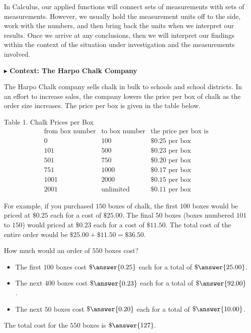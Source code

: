 \documentclass{ximera}
\begin{document}
In Calculus, our applied functions will connect sets of measurements with sets of measurements. However, we usually hold the measurement units off to the side, work with the numbers, and then bring back the units when we interpret our results.  Once we arrive at any conclusions, then we will interpret our findings within the context of the situation under investigation and the measurements involved. 




$\blacktriangleright$ \textbf{Context: The Harpo Chalk Company} 

The Harpo Chalk company sells chalk in bulk to schools and school districts. In an effort to increase sales, the company lowers the price per box of chalk as the order size increases.  The price per box is given in the table below. 




Table 1. Chalk Prices per Box
\[
\begin{array}{lll}
\text{from box number} & \text{to box number}  & \text{the price per box is} \\
0 &  100 &  \$0.25 \text{ per box}   \\
101 &  500 &  \$0.23 \text{ per box}   \\
501 &  750 &  \$0.20 \text{ per box}   \\
751 &  1000 &  \$0.17 \text{ per box}   \\
1001 &  2000 &  \$0.15 \text{ per box}   \\
2001 &  \text{unlimited} &  \$0.11 \text{ per box}   
\end{array}
\]




For example, if you purchased $150$ boxes of chalk, the first $100$ boxes would be priced at $\$0.25$ each for a cost of $\$25.00$.  The final $50$ boxes (boxes numbered $101$ to $150$) would priced at $\$0.23$ each for a cost of $\$11.50$.  The total cost of the entire order would be $\$25.00 + \$11.50 = \$36.50$.



\newpage

\begin{question} 


How much would an order of $550$ boxes cost?



\begin{itemize}
\item The first $100$ boxes cost $\$\answer{0.25}$ each for a total of $\$\answer{25.00}$.
\item The next $400$ boxes cost $\$\answer{0.23}$ each for a total of $\$\answer{92.00}$.
\item The next $50$ boxes cost $\$\answer{0.20}$ each for a total of $\$\answer{10.00}$.
\end{itemize}

The total cost for the $550$ boxes is $\$\answer{127}$.

\end{question}
\end{document}

